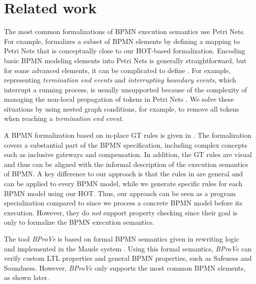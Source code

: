 \documentclass{lmcs} %
\begin{document}
\section{Related work} \label{sec:relatedWork}
The most common formalizations of BPMN execution semantics use Petri Nets.
For example, \cite{dijkmanSemanticsAnalysisBusiness2008} formalizes a subset of BPMN elements by defining a mapping to Petri Nets that is conceptually close to our HOT-based formalization.
Encoding basic BPMN modeling elements into Petri Nets is generally straightforward, but for some advanced elements, it can be complicated to define \cite{hofstedeWorkflowPatternsExpressive2002}.
For example, representing \textit{termination end events} and \textit{interrupting boundary events}, which interrupt a running process, is usually unsupported because of the complexity of managing the non-local propagation of tokens in Petri Nets \cite{corradiniFormalApproachAnalysis2021}.
We solve these situations by using nested graph conditions, for example, to remove all tokens when reaching a \textit{termination end event}.
 
A BPMN formalization based on in-place GT rules is given in \cite{vangorpVisualTokenbasedFormalization2013}.
The formalization covers a substantial part of the BPMN specification, including complex concepts such as inclusive gateways and compensation.
In addition, the GT rules are visual and thus can be aligned with the informal description of the execution semantics of BPMN.
A key difference to our approach is that the rules in \cite{vangorpVisualTokenbasedFormalization2013} are general and can be applied to every BPMN model, while we generate specific rules for each BPMN model using our HOT.
Thus, our approach can be seen as a program specialization compared to \cite{vangorpVisualTokenbasedFormalization2013} since we process a concrete BPMN model before its execution.
However, they do \textit{not} support property checking since their goal is only to formalize the BPMN execution semantics.

The tool \textit{BProVe} is based on formal BPMN semantics given in rewriting logic and implemented in the Maude system \cite{corradiniFormalApproachAnalysis2021}.
Using this formal semantics, \textit{BProVe} can verify custom LTL properties and general BPMN properties, such as Safeness and Soundness.
However, \textit{BProVe} only supports the most common BPMN elements, as shown later.
\end{document}
